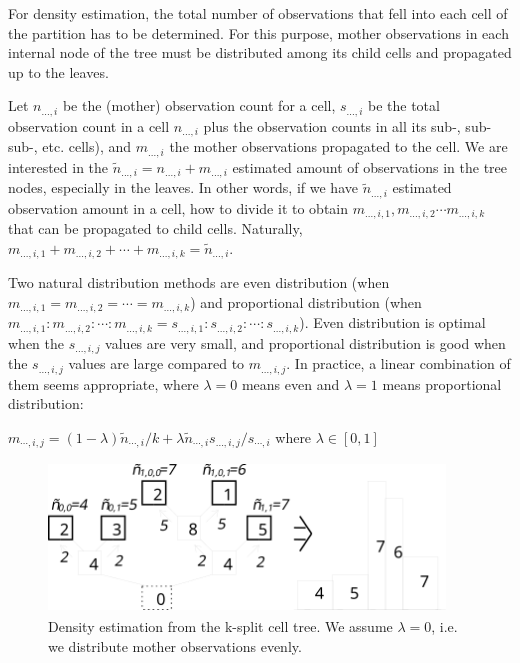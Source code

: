 For density estimation, the total number of observations that
fell into each cell of the partition has to be determined. For
this purpose, mother observations in each internal node of the
tree must be distributed among its child cells and propagated
up to the leaves.


Let $n_{...,i}$ be the (mother) observation count for a cell,
$s_{...,i}$ be the total observation count in a cell $n_{...,i}$ plus
the observation counts in all its sub-, sub-sub-, etc. cells), and
$m_{...,i}$ the mother observations propagated to the cell. We are
interested in the $\tilde{n}_{...,i} = n_{...,i} + m_{...,i}$
estimated amount of observations in the tree nodes, especially in the
leaves. In other words, if we have $\tilde{n}_{...,i}$ estimated
observation amount in a cell, how to divide it to obtain
$m_{...,i,1}, m_{...,i,2} \cdots m_{...,i,k}$
that can be propagated to child cells. Naturally,
$m_{...,i,1} + m_{...,i,2} + \cdots + m_{...,i,k} = \tilde{n}_{...,i}$.


Two natural distribution methods are even
distribution (when
$m_{...,i,1} = m_{...,i,2} = \cdots = m_{...,i,k}$) and proportional
distribution (when
$m_{...,i,1} : m_{...,i,2} : \cdots : m_{...,i,k} = s_{...,i,1} : s_{...,i,2} : \cdots : s_{...,i,k}$).
Even distribution is optimal when the
$s_{...,i,j}$ values are very small, and proportional distribution is
good when the $s_{...,i,j}$ values are large compared to
$m_{...,i,j}$. In practice, a linear combination of them seems
appropriate, where $\lambda=0$ means even and $\lambda=1$ means
proportional distribution:


$m_{\cdots,i,j} = (1-\lambda)\tilde{n}_{\cdots,i}/k + \lambda \tilde{n}_{\cdots,i} s_{...,i,j} / s_{\cdots,i}$
where $\lambda\in[0,1]$

\begin{figure}[htbp]
  \begin{center}
    \includegraphics[width=4.147in, height=1.567in]{figures/ksplit2}
    \caption{Density estimation from the k-split cell tree. We
      assume $\lambda=0$, i.e. we distribute mother observations
      evenly.}
  \end{center}
\end{figure}

